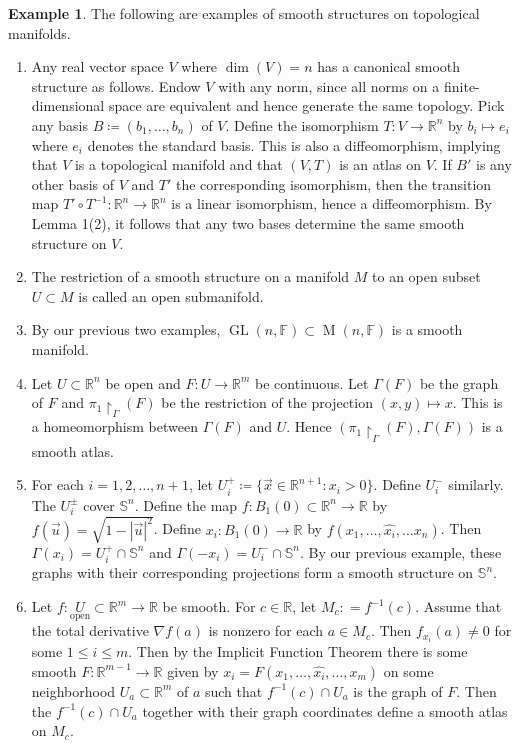 \documentclass[10pt,letterpaper,cm]{nupset}
\theoremstyle{definition}
\newtheorem{exmp}{Example}
\newcommand{\F}{\mathbb F}
\newcommand{\R}{\mathbb R}
\renewcommand{\S}{\mathbb S}
\newcommand{\1}{\mathbf{1}}
\renewcommand{\u}{\vec u}
\newcommand{\x}{\vec x}
\newcommand{\0}{\vec 0}
\DeclareMathOperator{\GL}{GL}
\DeclareMathOperator{\M}{M}
\begin{document}
\begin{exmp}{The following are examples of smooth structures on topological manifolds.}

\begin{enumerate}
\item Any real vector space $V$ where $\dim(V) = n$ has a canonical smooth structure as follows. Endow $V$ with any norm, since all norms on a finite-dimensional space are equivalent and hence generate the same topology. Pick any basis $B\coloneqq  (b_1, \ldots, b_n)$ of $V$.  Define the isomorphism  $T: V \to \R^n$ by $b_i \mapsto e_i$ where $e_i$ denotes the standard basis. This is also a diffeomorphism, implying that $V$ is a topological manifold and that $(V, T)$ is an atlas on $V$. If $B'$ is any other basis of $V$ and $T'$ the corresponding isomorphism, then the transition map $T' \circ T^{-1}: \R^n \to \R^n$ is a linear isomorphism, hence a diffeomorphism. By Lemma 1(2), it follows that any two bases determine the same smooth structure on $V$. 
\item The restriction of a smooth structure on  a manifold $M$ to an open subset $U \subset M$ is called an open submanifold. 
\item By our previous two examples, $\GL(n, \F) \subset \M(n, \F)$ is a smooth manifold.
\item Let $U\subset \R^n$ be open and $F: U \to \R^m$ be continuous. Let $\Gamma(F)$ be the graph of $F$ and $\pi_1\restriction_\Gamma(F)$ be the restriction of the projection $(x, y)\mapsto x$. This is a homeomorphism between $\Gamma(F)$ and $U$. Hence $(\pi_1 \restriction_\Gamma(F), \Gamma(F))$ is a smooth atlas.
\item For each $i = 1, 2, \ldots, n+1$, let $U_i^+ \coloneqq  \{ \x \in \R^{n+1}: x_i >0\}$. Define $U_i^-$ similarly. The $U_i^{\pm}$ cover $\S^n$. Define the map $f: B_1(0)\subset \R^n \to \R$ by $f(\u) = \sqrt{1 - |\u|^2}$. Define $x_i: B_1(0) \to \R$ by $f(x_1, \ldots, \widehat{x_i}, \ldots x_n)$.  Then $\Gamma(x_i) = U_i^+ \cap \S^n$ and $\Gamma(-x_i) = U_i^- \cap \S^n$. By our previous example, these graphs with their corresponding projections form a smooth structure on $\S^n$.
\item Let $f: \underset{\text{open}}U\subset \R^m \to \R$ be smooth. For $c \in \R$, let $M_c: = f^{-1}(c)$. Assume that the total derivative $\nabla f(a)$ is nonzero for each $a \in M_c$.  Then $f_{x_i}(a) \ne 0$ for some $1 \leq i \leq m$. Then by the Implicit Function Theorem there is some smooth $F: \R^{m-1} \to \R$ given by $x_i = F(x_1, \ldots, \widehat{x_i}, \ldots, x_m)$ on some neighborhood $U_a\subset \R^m$ of $a$ such that $f^{-1}(c) \cap U_a$ is the graph of $F$.  Then the $f^{-1}(c) \cap U_a$ together with their graph coordinates define a smooth atlas on $M_c$.

\end{enumerate}
\end{exmp}
\end{document}
